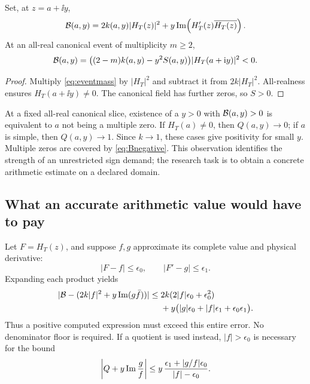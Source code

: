\begin{proposition}\label{prop:sign}
Set, at \(z=a+\ii y\),
\begin{equation}\label{eq:B}
 \mathcal B(a,y)=2k(a,y)|H_T(z)|^2+
             y\operatorname{Im}\!\left(H_T'(z)\overline{H_T(z)}\right).
\end{equation}
At an all-real canonical event of multiplicity \(m\ge2\),
\begin{equation}\label{eq:Bnegative}
 \mathcal B(a,y)=\bigl((2-m)k(a,y)-y^2S(a,y)\bigr)|H_T(a+\mathrm i y)|^2<0.
\end{equation}
\end{proposition}
\begin{proof}
Multiply \eqref{eq:eventmass} by \(|H_T|^2\) and subtract it from
\(2k|H_T|^2\). All-realness ensures \(H_T(a+\ii y)\ne0\).
The canonical field has further zeros, so \(S>0\).
\end{proof}

At a fixed all-real canonical slice, existence of a \(y>0\) with
\(\mathcal B(a,y)>0\) is equivalent to \(a\) not being a multiple zero.
If \(H_T(a)\ne0\), then \(Q(a,y)\to0\); if \(a\) is simple, then
\(Q(a,y)\to1\). Since \(k\to1\), these cases give positivity for small
\(y\). Multiple zeros are covered by \eqref{eq:Bnegative}.
This observation identifies the strength of an unrestricted sign demand;
the research task is to obtain a concrete arithmetic estimate on a
declared domain.

\subsection{What an accurate arithmetic value would have to pay}

Let \(F=H_T(z)\), and suppose \(f,g\) approximate its complete value
and physical derivative:
\[
 |F-f|\le\epsilon_0,\qquad |F'-g|\le\epsilon_1.
\]
Expanding each product yields
\begin{equation}\label{eq:Berror}
\begin{split}
 |\mathcal B-(2k|f|^2+y\operatorname{Im}(g\bar f))|
 \le{}&2k(2|f|\epsilon_0+\epsilon_0^2)\\
 &+y\bigl(|g|\epsilon_0+|f|\epsilon_1+\epsilon_0\epsilon_1\bigr).
\end{split}
\end{equation}
Thus a positive computed expression must exceed this entire error.
No denominator floor is required. If a quotient is used instead,
\(|f|>\epsilon_0\) is necessary for the bound
\begin{equation}\label{eq:quotient}
 \left|Q+y\operatorname{Im}\frac gf\right|
 \le y\,\frac{\epsilon_1+|g/f|\epsilon_0}{|f|-\epsilon_0}.
\end{equation}

